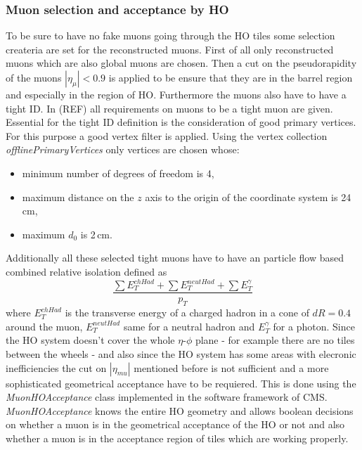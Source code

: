 		\subsubsection{Muon selection and acceptance by HO}
		\label{thesectionhere}
			To be sure to have no fake muons going through the HO tiles some selection createria are set for the reconstructed muons.
			First of all only reconstructed muons which are also global muons are chosen.
			Then a cut on the pseudorapidity of the muons $|\eta_\mu| < 0.9$ is applied to be ensure that they are in the barrel region and especially in the region of HO.
			Furthermore the muons also have to have a tight ID.
			In (REF) all requirements on muons to be a tight muon are given.
			Essential for the tight ID definition is the consideration of good primary vertices.
			For this purpose a good vertex filter is applied.
			Using the vertex collection \textit{offlinePrimaryVertices} only vertices are chosen whose:
			\begin{itemize}
				\item minimum number of degrees of freedom is 4,
				\item maximum distance on the $z$ axis to the origin of the coordinate system is 24\,cm,
				\item maximum $d_0$ is 2\,cm.
			\end{itemize}
			Additionally all these selected tight muons have to have an particle flow based combined relative isolation defined as
			\begin{equation}
				\frac{\sum{E_T^{chHad}} + \sum{E_T^{neutHad}} + \sum{E_T^\gamma}}{p_T}
			\end{equation}
			where $E_T^{chHad}$ is the transverse energy of a charged hadron in a cone of $dR = 0.4$ around the muon, $E_T^{neutHad}$ same for a neutral hadron and $E_T^\gamma$ for a photon.
			Since the HO system doesn't cover the whole $\eta$-$\phi$ plane - for example there are no tiles between the wheels - and also since the HO system has some areas with elecronic inefficiencies the
			cut on $|\eta_{mu}|$ mentioned before is not sufficient and a more sophisticated geometrical acceptance have to be requiered.
			This is done using the \textit{MuonHOAcceptance} class implemented in the software framework of CMS.
			\textit{MuonHOAcceptance} knows the entire HO geometry and allows boolean decisions on whether a muon is in the geometrical acceptance of the HO or not and also whether a muon is in the acceptance region of
			tiles which are working properly.
